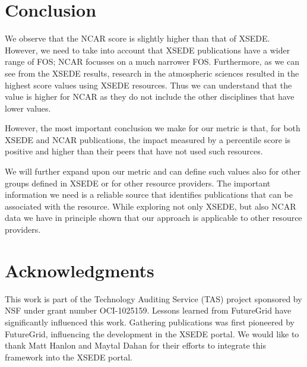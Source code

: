 \documentclass{sig-alternate}
\begin{document}
\section{Conclusion} \label{S:conclusion}

We observe that the NCAR score is slightly higher than that of XSEDE. However, we need to take into account that XSEDE publications have a wider range of FOS; NCAR focusses on a much narrower FOS. Furthermore, as we can see from the XSEDE results, research in the atmospheric sciences resulted in the highest score values using XSEDE resources. Thus we can understand that the value is higher for NCAR as they do not include the other disciplines that have lower values.

However, the most important conclusion we make for our metric is that, for both XSEDE and NCAR publications, the impact measured by a percentile score is positive and higher than their peers that have not used such resources. 

We will further expand upon our metric and can define such values also for other groups defined in XSEDE or for other resource providers. The important information we need is a reliable source that identifies publications that can be associated with the resource. While exploring not only XSEDE, but also NCAR data we have in principle shown that our approach is applicable to other resource providers.


\section{Acknowledgments}

 
This work is part of the Technology Auditing Service (TAS) project sponsored by NSF under grant number OCI-1025159. Lessons learned from FutureGrid have significantly influenced this work. Gathering publications was first pioneered by FutureGrid, influencing the development in the XSEDE portal. We would like to thank Matt Hanlon and Maytal Dahan for their efforts to integrate this framework into the XSEDE portal. 
 
%
%
 
 
\end{document}
